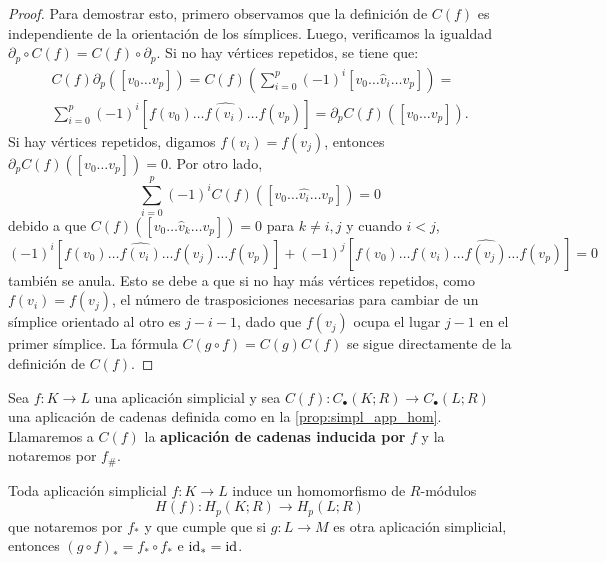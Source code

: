 \begin{proof}
	Para demostrar esto, primero observamos que la definición de \(C(f)\) es independiente de la orientación de los símplices. Luego, verificamos la igualdad \(\partial_p \circ C(f) = C(f) \circ \partial_p\). Si no hay vértices repetidos, se tiene que:
	\begin{gather*}
		C(f) \partial_p([v_0 \ldots v_p]) = C(f) \left( \sum_{i=0}^p (-1)^i [v_0 \ldots \hat{v}_i \ldots v_p] \right) = \\
		\sum_{i=0}^p (-1)^i [f(v_0) \ldots \widehat{f(v_i)} \ldots f(v_p)] = \partial_p C(f)([v_0 \ldots v_p]).
	\end{gather*}
	Si hay vértices repetidos, digamos \(f(v_i) = f(v_j)\), entonces \(\partial_p C(f)([v_0 \dots v_p]) = 0\). Por otro lado,
	\[
	\sum_{i=0}^p (-1)^i C(f)([v_0 \dots \hat{v_i} \ldots v_p]) = 0
	\]
	debido a que \(C(f)([v_0 \dots \hat{v}_k \dots v_p]) = 0\) para \(k \neq i,j\) y cuando \(i < j\),
	\[
	(-1)^i [f(v_0) \ldots \widehat{f(v_i)} \ldots f(v_j) \ldots f(v_p)] + (-1)^j [f(v_0) \ldots f(v_i) \ldots \widehat{f(v_j)} \ldots f(v_p)] = 0
	\]
	también se anula. Esto se debe a que si no hay más vértices repetidos, como \(f(v_i) = f(v_j)\), el número de trasposiciones necesarias para cambiar de un símplice orientado al otro es \(j-i-1\), dado que \(f(v_j)\) ocupa el lugar \(j-1\) en el primer símplice. La fórmula \(C(g \circ f)=C(g)C(f)\) se sigue directamente de la definición de \(C(f)\).
\end{proof}
\begin{definicion}
	\label{def:chain-map-ind}
	Sea $f : K \to L$ una aplicación simplicial y sea $C(f): C_{\bullet}(K;R) \to C_{\bullet}(L;R)$ una aplicación de cadenas definida como en la \autoref{prop:simpl_app_hom}. Llamaremos a $C(f)$ la \textbf{aplicación de cadenas inducida por} $f$ y la notaremos por $f_\#$.
\end{definicion}
\begin{corolario}
	Toda aplicación simplicial $f: K \to L$ induce un homomorfismo de $R$-módulos
	\[
		H(f) : H_p(K;R) \to H_p(L;R)
	\]
	que notaremos por $f_*$ y 
	que cumple que si $g: L \to M$ es otra aplicación simplicial, entonces $(g \circ f)_*=f_* \circ f_*$ e $\operatorname{id}_* = \operatorname{id}$.
\end{corolario}
